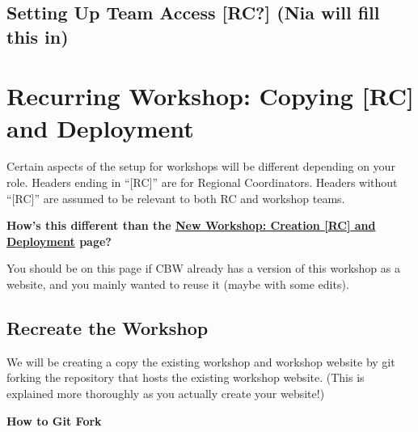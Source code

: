 \documentclass[
]{book}
\newenvironment{greenbox}{
  \definecolor{shadecolor}{RGB}{141, 181, 128}
  \color{white}
  \begin{shaded}}
 {\end{shaded}}
\theoremstyle{definition}
\theoremstyle{definition}
\theoremstyle{definition}
\theoremstyle{definition}
\theoremstyle{remark}
\begin{document}
\section{Setting Up Team Access {[}RC?{]} (Nia will fill this in)}\label{setting-up-team-access-rc-nia-will-fill-this-in}

\chapter{\texorpdfstring{\textbf{Recurring Workshop}: Copying {[}RC{]} and Deployment}{Recurring Workshop: Copying {[}RC{]} and Deployment}}\label{recurring-workshop-copying-rc-and-deployment}

Certain aspects of the setup for workshops will be different depending on your role. Headers ending in ``{[}RC{]}'' are for Regional Coordinators. Headers without ``{[}RC{]}'' are assumed to be relevant to both RC and workshop teams.

\begin{greenbox}

\begin{center}
\textbf{How's this different than the \hyperref[new-workshop-create-deploy]{New Workshop: Creation {[}RC{]} and Deployment} page?}

\end{center}

You should be on this page if CBW already has a version of this workshop as a website, and you mainly wanted to reuse it (maybe with some edits).

\end{greenbox}

\section{Recreate the Workshop}\label{recreate-the-workshop}

We will be creating a copy the existing workshop and workshop website by git forking the repository that hosts the existing workshop website. (This is explained more thoroughly as you actually create your website!)

\textbf{How to Git Fork}
\end{document}
